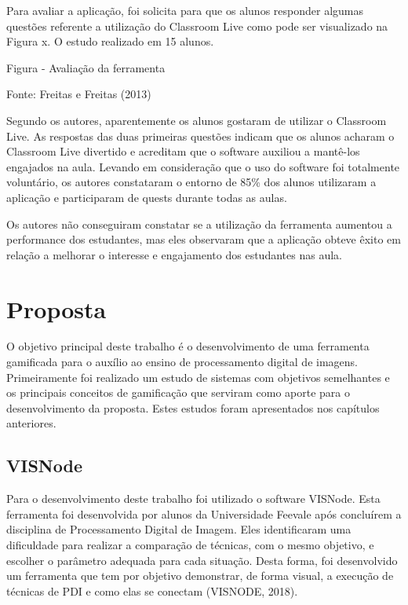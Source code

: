 \documentclass[
	12pt,				%
	oneside,			%
	a4paper,			%
	english,			%
	french,				%
	spanish,			%
	brazil,				%
	]{abntex2}
\begin{document}
Para avaliar a aplicação, foi solicita para que os alunos responder algumas questões referente a utilização do Classroom Live como pode ser visualizado na Figura x. O estudo realizado em 15 alunos.

Figura - Avaliação da ferramenta

Fonte: Freitas e Freitas (2013)

Segundo os autores, aparentemente os alunos gostaram de utilizar o Classroom Live. As respostas das duas primeiras questões indicam que os alunos acharam o Classroom Live divertido e acreditam que o software auxiliou a mantê-los engajados na aula. Levando em consideração que o uso do software foi totalmente voluntário, os autores constataram o entorno de 85\% dos alunos utilizaram a aplicação e participaram de quests durante todas as aulas. 

Os autores não conseguiram constatar se a utilização da ferramenta aumentou a performance dos estudantes, mas eles observaram que a aplicação obteve êxito em relação a melhorar o interesse e engajamento dos estudantes nas aula.

\chapter{Proposta} 

O objetivo principal deste trabalho é o desenvolvimento de uma ferramenta gamificada para o auxílio ao ensino de processamento digital de imagens. Primeiramente foi realizado um estudo de sistemas com objetivos semelhantes e os principais conceitos de gamificação que serviram como aporte para o desenvolvimento da proposta. Estes estudos foram apresentados nos capítulos anteriores.
    
\section{VISNode}

Para o desenvolvimento deste trabalho foi utilizado o software VISNode. Esta ferramenta foi desenvolvida por alunos da Universidade Feevale após concluírem a disciplina de Processamento Digital de Imagem. Eles identificaram uma dificuldade para realizar a comparação de técnicas, com o mesmo objetivo, e escolher o parâmetro adequada para cada situação. Desta forma, foi desenvolvido um ferramenta que tem por objetivo demonstrar, de forma visual,  a execução de técnicas de PDI e como elas se conectam (VISNODE, 2018).
\end{document}
